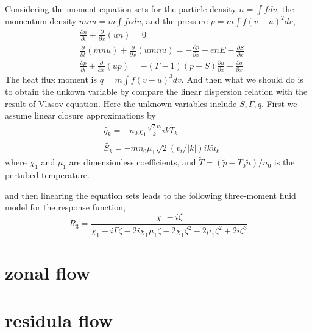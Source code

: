 \documentclass[11pt,a4paper]{article}
\begin{document}
	Considering the moment equation sets for the particle density $n=\int{f}dv$, the momentum density $mnu=m\int{fv}dv$, and the pressure $p=m\int{f(v-u)^2dv}$,
	\begin{equation}
	\begin{aligned}
	&\frac{\partial{n}}{\partial{t}}+\frac{\partial}{\partial{x}}(un)=0\\
	&\frac{\partial}{\partial{t}}(mnu)+\frac{\partial}{\partial{x}}(umnu)=-\frac{\partial{p}}{\partial{x}}+enE-\frac{\partial{S}}{\partial{x}}	\\
	&\frac{\partial{p}}{\partial{t}}+\frac{\partial}{\partial{x}}(up)=
	-(\Gamma-1)(p+S)\frac{\partial{u}}{\partial{x}}-\frac{\partial{q}}{\partial{x}}
	\end{aligned}
	\end{equation}
	The heat flux moment is $q=m\int{f(v-u)^3}dv$. And then what we should do is to obtain the unkown variable by compare the linear dispersion relation with the result of Vlasov equation. Here the unknown variables include $S,\Gamma,q$. First we assume linear closure approximations by 
	\begin{equation}
	\begin{aligned}
	&\tilde{q_k}=-n_0\chi_1\frac{\sqrt{2}v_t}{|k|}ik\tilde{T}_k	\\
	&\tilde{S_k}=-mn_0\mu_1\sqrt{2}(v_t/|k|)ik\tilde{u}_k
	\end{aligned}
	\end{equation}
	where $\chi_1$ and $\mu_1$ are dimensionless coefficients, and $\tilde{T}=(\tilde{p}-T_0\tilde{n})/n_0$ is the pertubed temperature.
	
	and then linearing the equation sets leads to the following three-moment fluid model for the response function, 
	\begin{equation}
		R_3=\frac{\chi_1-i\zeta}{\chi_1-i\Gamma\zeta-2i\chi_1\mu_1\zeta-2\chi_1\zeta^2-2\mu_1\zeta^2+2i\zeta^3}
	\end{equation}
	
	
	
	
\newpage	
\section{zonal flow}

\newpage
\section{residula flow}	
\end{document}

